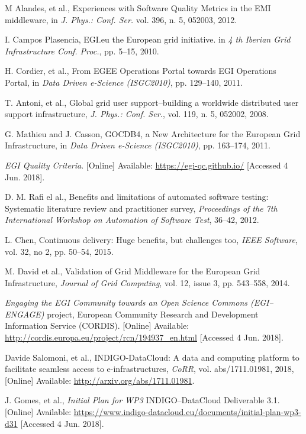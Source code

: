\documentclass[journal]{IEEEtran}
\begin{document}
\begin{thebibliography}{1}
M Alandes, et al.,
Experiences with Software Quality Metrics in the EMI middleware,
in \emph{J. Phys.: Conf. Ser.}
vol. 396, n. 5, 052003, 2012.

I. Campos Plasencia,
EGI.eu the European grid initiative.
in \emph{4 th Iberian Grid Infrastructure Conf. Proc.},
pp. 5--15, 2010.

H. Cordier, et al.,
From EGEE Operations Portal towards EGI Operations Portal,
in \emph{Data Driven e-Science (ISGC2010)},
pp. 129--140, 2011.

T. Antoni, et al.,
Global grid user support--building a worldwide distributed user support infrastructure,
\emph{J. Phys.: Conf. Ser.},
vol. 119, n. 5, 052002, 2008.

G. Mathieu and J. Casson,
GOCDB4, a New Architecture for the European Grid Infrastructure,
in \emph{Data Driven e-Science (ISGC2010)},
pp. 163--174, 2011.

\emph{EGI Quality Criteria}.
[Online] Available: \url{https://egi-qc.github.io/}
[Accessed 4 Jun. 2018].

D. M. Rafi el al.,
Benefits and limitations of automated software testing: Systematic literature review and practitioner survey,
\emph{Proceedings of the 7th International Workshop on Automation of Software Test},
36--42, 2012.

L. Chen,
Continuous delivery: Huge benefits, but challenges too,
\emph{IEEE Software},
vol. 32, no 2, pp. 50--54, 2015.

M. David et al.,
Validation of Grid Middleware for the European Grid Infrastructure,
\emph{Journal of Grid Computing},
vol. 12, issue 3, pp. 543--558, 2014.

\emph{Engaging the EGI Community towards an Open Science Commons (EGI--ENGAGE)}
project, European Community Research and Development Information Service (CORDIS).
[Online] Available: \url{http://cordis.europa.eu/project/rcn/194937\_en.html}
[Accessed 4 Jun. 2018].

Davide Salomoni, et al.,
INDIGO-DataCloud: {A} data and computing platform to facilitate seamless access to e-infrastructures,
\emph{CoRR},
vol. abs/1711.01981, 2018,
[Online] Available: \url{http://arxiv.org/abs/1711.01981}.

J. Gomes, et al.,
\emph{Initial Plan for WP3} INDIGO--DataCloud Deliverable 3.1.
[Online] Available: \url{https://www.indigo-datacloud.eu/documents/initial-plan-wp3-d31}
[Accessed 4 Jun. 2018].


\end{thebibliography}
\end{document}

